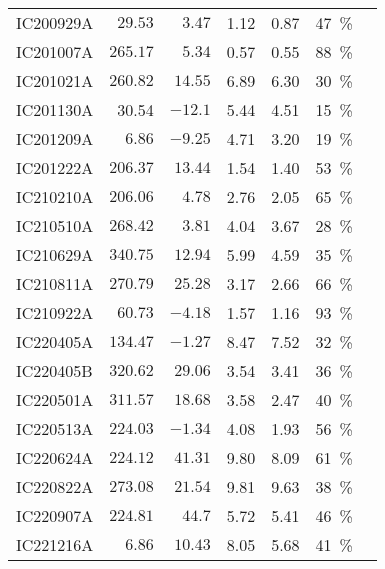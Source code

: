 \begin{table*}
\begin{tabular}{l r r r r c c}
        IC200929A & $29.53$ & $3.47$ & 1.12 & 0.87 & \SI{47}{\percent}&\cite{IC200929A1, IC200929A2}\\
        IC201007A & $265.17$ & $5.34$ & 0.57 & 0.55 & \SI{88}{\percent}&\cite{IC201007A1, IC201007A2}\\
        IC201021A & $260.82$ & $14.55$ & 6.89 & 6.30 & \SI{30}{\percent}&\cite{IC201021A1, IC201021A2}\\
        IC201130A & 30.54 & $-12.1$ & 5.44 & 4.51 & \SI{15}{\percent}&\cite{IC201130A1, IC201130A2}\\
        IC201209A & $6.86$ & $-9.25$ & 4.71 & 3.20 & \SI{19}{\percent}&\cite{IC201209A1, IC201209A2}\\
        IC201222A & $206.37$ & $13.44$ & 1.54 & 1.40 & \SI{53}{\percent}&\cite{IC201222A1, IC201222A2}\\
        IC210210A & $206.06$ & $4.78$ & 2.76 & 2.05 & \SI{65}{\percent}&\cite{IC210210A1, IC210210A2}\\
        IC210510A & $268.42$ & $3.81$ & 4.04 & 3.67 & \SI{28}{\percent}&\cite{IC210510A1, IC210510A2}\\
        IC210629A & $340.75$ & $12.94$ & 5.99 & 4.59 & \SI{35}{\percent}&\cite{IC210629A1, IC210629A2}\\
        IC210811A & $270.79$ & $25.28$ & 3.17 & 2.66 & \SI{66}{\percent}&\cite{IC210811A1, IC210811A2}\\
        IC210922A & $60.73$ & $-4.18$ & 1.57 & 1.16 & \SI{93}{\percent}&\cite{IC210922A1, IC210922A2}\\
        IC220405A & $134.47$ & $-1.27$ & 8.47 & 7.52 & \SI{32}{\percent}&\cite{IC220405A1, IC220405A2}\\
        IC220405B & $320.62$ & $29.06$ & 3.54 & 3.41 & \SI{36}{\percent}&\cite{IC220405B1, IC220405A2}\\
        IC220501A & $311.57$ & $18.68$ & 3.58 & 2.47 & \SI{40}{\percent}&\cite{IC220501A1, IC220501A2}\\
        IC220513A & $224.03$ & $-1.34$ & 4.08 & 1.93 & \SI{56}{\percent}&\cite{IC220513A1, IC220513A2}\\
        IC220624A & $224.12$ & $41.31$ & 9.80 & 8.09 & \SI{61}{\percent}&\cite{IC220624A1, IC220624A2}\\
        IC220822A & $273.08$ & $21.54$ & 9.81 & 9.63 & \SI{38}{\percent}&\cite{IC220822A1, IC220822A2}\\
        IC220907A & $224.81$ & $44.7$ & 5.72 & 5.41 & \SI{46}{\percent}&\cite{IC220907A1, IC220907A2}\\
        IC221216A & $6.86$ & $10.43$ & 8.05 & 5.68 & \SI{41}{\percent}&\cite{IC221216A1, IC221216A2}\\

\end{tabular}
\end{table*}
